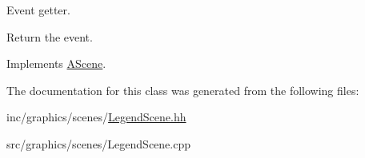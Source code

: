 Event getter. 

Return the event. 

Implements \hyperlink{classAScene_af521e5e6d30a5d2e5d30eb333e4d3abd}{A\+Scene}.



The documentation for this class was generated from the following files\+:\begin{DoxyCompactItemize}
\item 
inc/graphics/scenes/\hyperlink{LegendScene_8hh}{Legend\+Scene.\+hh}\item 
src/graphics/scenes/Legend\+Scene.\+cpp\end{DoxyCompactItemize}
